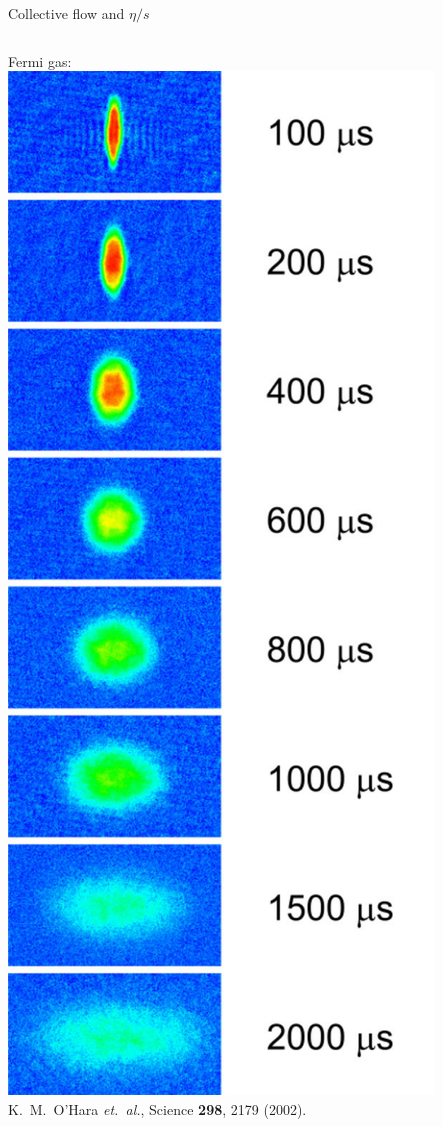 \documentclass{beamer}
\begin{document}
\begin{frame}{Collective flow and $\eta/s$}
\begin{columns}
    \small
    Fermi gas: \\[.5ex]
    \includegraphics[width=.9\textwidth]{third_party/lithium} \\
    \tiny K.~M.~O'Hara {\em et.\ al.}, Science {\bf 298}, 2179 (2002).
  \end{columns}
\end{frame}
\end{document}
